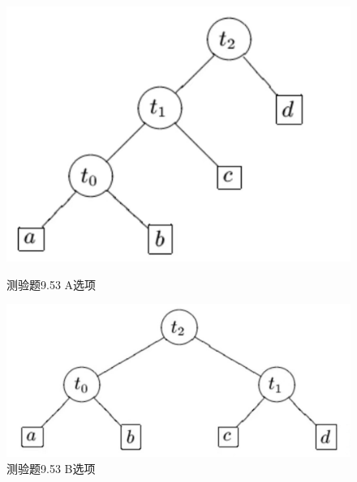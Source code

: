 \documentclass[UTF8, heading=true]{ctexart}
\begin{document}
\begin{figure}[H]
  \centering
  \begin{minipage}[t]{0.35\textwidth}
      \centering
      \includegraphics[width=1\textwidth]{9.53_1.jpg} %
      \vspace{-0.3cm}
      \caption{测验题9.53 A选项}
  \end{minipage}
  \hspace{0.1\textwidth} %
  \begin{minipage}[t]{0.35\textwidth}
      \centering
      \includegraphics[width=1\textwidth]{9.53_2.jpg} %
      \vspace{-0.3cm}
      \caption{测验题9.53 B选项}
\end{minipage}
\end{figure}
\end{document}
